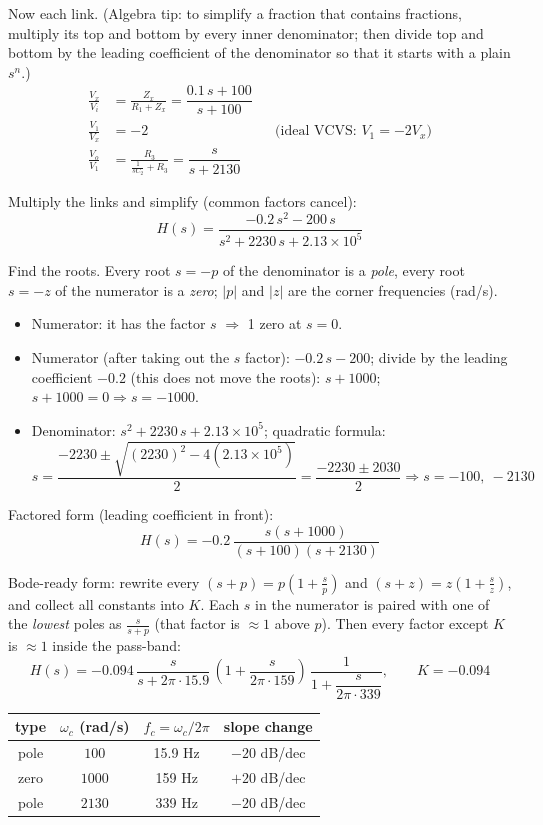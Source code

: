 \documentclass[11pt]{article}
\newcommand{\solstep}[2]{\par\medskip{\color{stepc}\textbf{Step #1 --- #2}}\par\nopagebreak}
\begin{document}
Now each link. {\small (Algebra tip: to simplify a fraction that contains fractions, multiply its top and bottom by every inner denominator; then divide top and bottom by the leading coefficient of the denominator so that it starts with a plain $s^n$.)}
\begin{align*}
\frac{V_{x}}{V_{i}} &= \frac{Z_{x}}{R_{1} + Z_{x}} = \dfrac{0.1\,s + 100}{s + 100} \\
\frac{V_{1}}{V_{x}} &= -2 &&\text{(ideal VCVS: $V_{1} = -2V_{x}$)} \\
\frac{V_{o}}{V_{1}} &= \frac{R_{3}}{\frac{1}{sC_{2}} + R_{3}} = \dfrac{s}{s + 2130}
\end{align*}

Multiply the links and simplify (common factors cancel):\[
H(s) = \dfrac{-0.2\,s^{2} - 200\,s}{s^{2} + 2230\,s + 2.13\times 10^{5}}
\]

\solstep{5}{Standard (Bode-ready) form}Find the roots. Every root $s=-p$ of the denominator is a \emph{pole}, every root $s=-z$ of the numerator is a \emph{zero}; $|p|$ and $|z|$ are the corner frequencies (rad/s).
\begin{itemize}[leftmargin=*,itemsep=2pt]
\item Numerator: it has the factor $s$ $\Rightarrow$ 1 zero at $s=0$.
\item Numerator (after taking out the $s$ factor): $-0.2\,s - 200$; divide by the leading coefficient $-0.2$ (this does not move the roots): $s + 1000$; $s + 1000 = 0 \Rightarrow s = -1000$.
\item Denominator: $s^{2} + 2230\,s + 2.13\times 10^{5}$; quadratic formula:\[
s = \frac{-2230 \pm \sqrt{(2230)^2 - 4(2.13\times 10^{5})}}{2} = \frac{-2230 \pm 2030}{2} \Rightarrow s = -100,\ -2130
\]

\end{itemize}

Factored form (leading coefficient in front):
\[
H(s) = -0.2\,\dfrac{s(s+1000)}{(s+100)(s+2130)}
\]

Bode-ready form: rewrite every $(s+p) = p\left(1+\frac{s}{p}\right)$ and $(s+z) = z\left(1+\frac{s}{z}\right)$, and collect all constants into $K$. Each $s$ in the numerator is paired with one of the \emph{lowest} poles as $\frac{s}{s+p}$ (that factor is $\approx 1$ above $p$). Then every factor except $K$ is $\approx 1$ inside the pass-band:
\[
H(s) = -0.094\,\dfrac{s}{s+2\pi\cdot 15.9}\,\left(1+\dfrac{s}{2\pi\cdot 159}\right)\,\dfrac{1}{1+\dfrac{s}{2\pi\cdot 339}},\qquad K = -0.094
\]

\begin{center}\renewcommand{\arraystretch}{1.35}
\begin{tabular}{cccc}
\toprule
type & $\omega_c$ (rad/s) & $f_c=\omega_c/2\pi$ & slope change \\
\midrule
pole & $100$ & 15.9 Hz & $-20$ dB/dec \\
zero & $1000$ & 159 Hz & $+20$ dB/dec \\
pole & $2130$ & 339 Hz & $-20$ dB/dec \\
\bottomrule
\end{tabular}\end{center}
\end{document}
